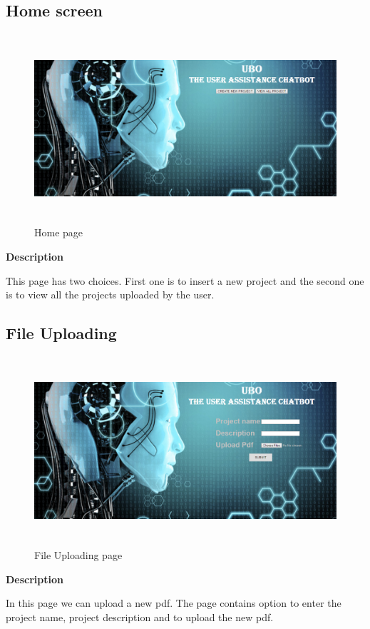 \documentclass[12pt,a4paper,oneside]{report}
\begin{document}
\newpage
\subsection{Home screen}
\begin{figure}[h]
	\begin{center}
		\includegraphics[width=13cm,height=7cm]{home.png}
			\caption{Home page}
			\label{Home page}
	\end{center}
\end{figure}
\textbf{Description}
\par This page has two choices. First one is to insert a new project and the second one is to view all the projects uploaded by the user.


\newpage
\subsection{File Uploading}
\begin{figure}[h]
	\begin{center}
		\includegraphics[width=13cm,height=7cm]{new_project.png}
			\caption{File Uploading page}
			\label{File Uploading page}
	\end{center}
\end{figure}
\textbf{Description}
\par In this page we can upload a new pdf. The page contains option to enter the project name, project description and to upload the new pdf.
\end{document}
